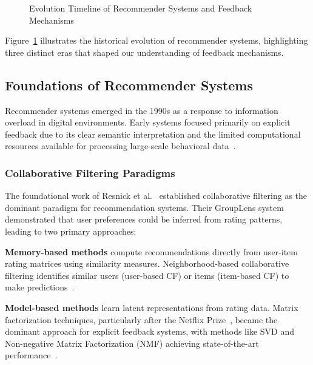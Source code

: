 \begin{figure}[ht]
\caption{Evolution Timeline of Recommender Systems and Feedback Mechanisms}
\label{fig:evolution_timeline}
\end{figure}

Figure~\ref{fig:evolution_timeline} illustrates the historical evolution of recommender systems, highlighting three distinct eras that shaped our understanding of feedback mechanisms.

\subsection{Foundations of Recommender Systems}

Recommender systems emerged in the 1990s as a response to information overload in digital environments. Early systems focused primarily on explicit feedback due to its clear semantic interpretation and the limited computational resources available for processing large-scale behavioral data~\cite{resnick1994grouplens,shardanand1995social}.

\subsubsection{Collaborative Filtering Paradigms}
The foundational work of Resnick et al.~\cite{resnick1994grouplens} established collaborative filtering as the dominant paradigm for recommendation systems. Their GroupLens system demonstrated that user preferences could be inferred from rating patterns, leading to two primary approaches:

\textbf{Memory-based methods} compute recommendations directly from user-item rating matrices using similarity measures. Neighborhood-based collaborative filtering identifies similar users (user-based CF) or items (item-based CF) to make predictions~\cite{herlocker1999algorithmic,sarwar2001item}.

\textbf{Model-based methods} learn latent representations from rating data. Matrix factorization techniques, particularly after the Netflix Prize~\cite{bennett2007netflix}, became the dominant approach for explicit feedback systems, with methods like SVD and Non-negative Matrix Factorization (NMF) achieving state-of-the-art performance~\cite{koren2009matrix,lee1999learning}.


